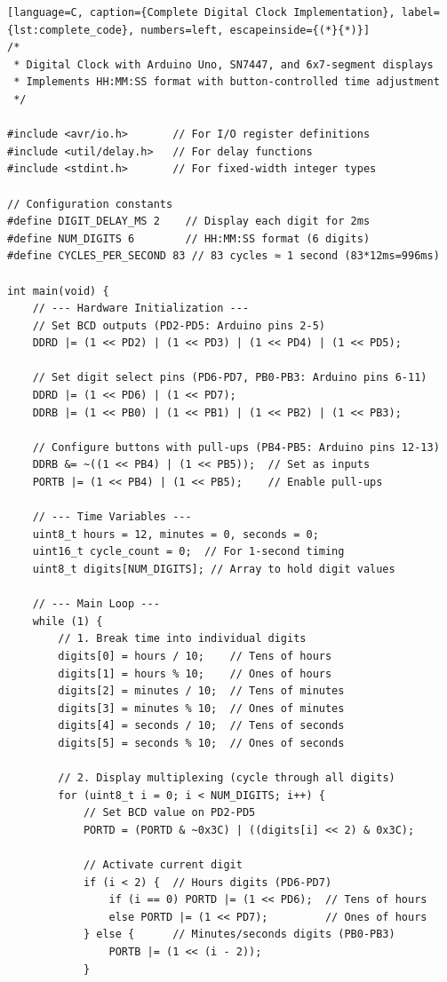 \documentclass{article}
\begin{document}
\begin{lstlisting}[language=C, caption={Complete Digital Clock Implementation}, label={lst:complete_code}, numbers=left, escapeinside={(*}{*)}]
/*
 * Digital Clock with Arduino Uno, SN7447, and 6x7-segment displays
 * Implements HH:MM:SS format with button-controlled time adjustment
 */

#include <avr/io.h>       // For I/O register definitions
#include <util/delay.h>   // For delay functions
#include <stdint.h>       // For fixed-width integer types

// Configuration constants
#define DIGIT_DELAY_MS 2    // Display each digit for 2ms
#define NUM_DIGITS 6        // HH:MM:SS format (6 digits)
#define CYCLES_PER_SECOND 83 // 83 cycles ≈ 1 second (83*12ms=996ms)

int main(void) {
    // --- Hardware Initialization ---
    // Set BCD outputs (PD2-PD5: Arduino pins 2-5)
    DDRD |= (1 << PD2) | (1 << PD3) | (1 << PD4) | (1 << PD5);
    
    // Set digit select pins (PD6-PD7, PB0-PB3: Arduino pins 6-11)
    DDRD |= (1 << PD6) | (1 << PD7);
    DDRB |= (1 << PB0) | (1 << PB1) | (1 << PB2) | (1 << PB3);
    
    // Configure buttons with pull-ups (PB4-PB5: Arduino pins 12-13)
    DDRB &= ~((1 << PB4) | (1 << PB5));  // Set as inputs
    PORTB |= (1 << PB4) | (1 << PB5);    // Enable pull-ups

    // --- Time Variables ---
    uint8_t hours = 12, minutes = 0, seconds = 0;
    uint16_t cycle_count = 0;  // For 1-second timing
    uint8_t digits[NUM_DIGITS]; // Array to hold digit values

    // --- Main Loop ---
    while (1) {
        // 1. Break time into individual digits
        digits[0] = hours / 10;    // Tens of hours
        digits[1] = hours % 10;    // Ones of hours
        digits[2] = minutes / 10;  // Tens of minutes
        digits[3] = minutes % 10;  // Ones of minutes
        digits[4] = seconds / 10;  // Tens of seconds
        digits[5] = seconds % 10;  // Ones of seconds

        // 2. Display multiplexing (cycle through all digits)
        for (uint8_t i = 0; i < NUM_DIGITS; i++) {
            // Set BCD value on PD2-PD5
            PORTD = (PORTD & ~0x3C) | ((digits[i] << 2) & 0x3C);
            
            // Activate current digit
            if (i < 2) {  // Hours digits (PD6-PD7)
                if (i == 0) PORTD |= (1 << PD6);  // Tens of hours
                else PORTD |= (1 << PD7);         // Ones of hours
            } else {      // Minutes/seconds digits (PB0-PB3)
                PORTB |= (1 << (i - 2));
            }
            

\end{lstlisting}
\end{document}
